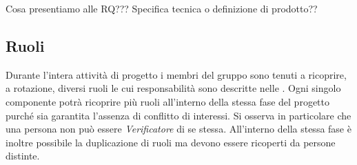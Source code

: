 Cosa presentiamo alle RQ??? Specifica tecnica o definizione di prodotto??

\subsection{Ruoli}
Durante l'intera attività di progetto i membri del gruppo \GroupName{} sono tenuti a ricoprire, a rotazione, diversi ruoli le cui responsabilità sono descritte nelle \NormeDiProgetto{}. Ogni singolo componente potrà ricoprire più ruoli all'interno della stessa fase del progetto purché sia garantita l'assenza di conflitto di interessi. Si osserva in particolare che una persona non può essere \textit{Verificatore} di se stessa. All'interno della stessa fase è inoltre possibile la duplicazione di ruoli ma devono essere ricoperti da persone distinte. 


